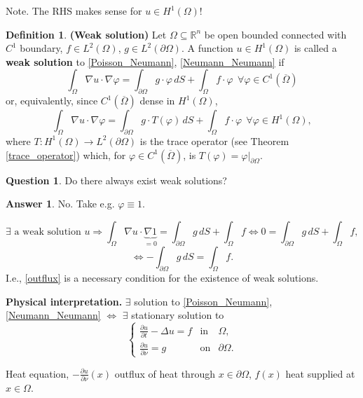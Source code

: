 \documentclass[12pt]{article}
\theoremstyle{definition}
\newtheorem{definition}{Definition}[section]
\newtheorem*{question}{Question}
\newtheorem*{answer}{Answer}
\begin{document}
Note. The RHS makes sense for $u\in H^1(\Omega)$!

\begin{definition}
\textbf{(Weak solution)} Let $\Omega\subseteq\mathbb R^n$ be open bounded connected with $C^1$ boundary, $f\in L^2(\Omega)$, $g\in L^2(\partial\Omega)$. A function $u\in H^1(\Omega)$ is called a \textbf{weak solution} to \eqref{Poisson_Neumann}, \eqref{Neumann_Neumann} if
\[\int_\Omega\nabla u\cdot\nabla\varphi=\int_{\partial\Omega}g\cdot\varphi\,dS+\int_\Omega f\cdot\varphi\ \ \forall\varphi\in C^1(\overline\Omega)\]
or, equivalently, since $C^1(\overline\Omega)$ dense in $H^1(\Omega)$,
\[\int_\Omega\nabla u\cdot\nabla\varphi=\int_{\partial\Omega}g\cdot T(\varphi)\,dS+\int_\Omega f\cdot\varphi\ \ \forall\varphi\in H^1(\Omega),\]
where $T:H^1(\Omega)\rightarrow L^2(\partial\Omega)$ is the trace operator (see Theorem \ref{trace_operator}) which, for $\varphi\in C^1(\overline\Omega)$, is $T(\varphi)=\varphi|_{\partial\Omega}$.
\end{definition}

\begin{question}
Do there always exist weak solutions?
\end{question}

\begin{answer}
No. Take e.g. $\varphi\equiv1$.

\[\exists\text{ a weak solution }u\Longrightarrow\int_\Omega\nabla u\cdot\underbrace{\nabla1}_{=0}=\int_{\partial\Omega}g\,dS+\int_\Omega f\Longleftrightarrow0=\int_{\partial\Omega}g\,dS+\int_\Omega f,\]
\begin{equation}\tag{$*$}\label{outflux}
\Longleftrightarrow-\int_{\partial\Omega}g\,dS=\int_\Omega f.
\end{equation}
I.e., \eqref{outflux} is a necessary condition for the existence of weak solutions.
\end{answer}

\textbf{Physical interpretation.} $\exists$ solution to \eqref{Poisson_Neumann}, \eqref{Neumann_Neumann} $\Leftrightarrow$ $\exists$ stationary solution to
\[\left\{\begin{array}{rcl}\displaystyle{\frac{\partial u}{\partial t}-\Delta u=f}&\text{in}&\Omega,\\\displaystyle{\frac{\partial u}{\partial\nu}=g}&\text{on}&\partial\Omega.\end{array}\right.\]

Heat equation, $-\frac{\partial u}{\partial\nu}(x)$ outflux of heat through $x\in\partial\Omega$, $f(x)$ heat supplied at $x\in\Omega$.
\end{document}
